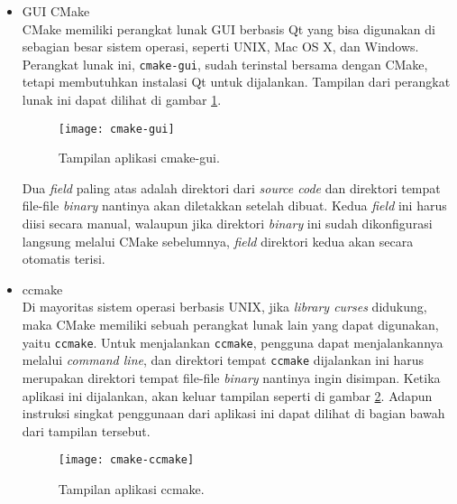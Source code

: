 \begin{enumerate}
	\begin{itemize}
		\item GUI CMake\\
		CMake memiliki perangkat lunak GUI berbasis Qt yang bisa digunakan di sebagian besar sistem operasi, seperti UNIX, Mac OS X, dan Windows. Perangkat lunak ini, \verb|cmake-gui|, sudah terinstal bersama dengan CMake, tetapi membutuhkan instalasi Qt untuk dijalankan. Tampilan dari perangkat lunak ini dapat dilihat di gambar \ref{fig:cmake-gui}.
		
		\begin{figure}[ht]
		    \centering
		    \texttt{[image: cmake-gui]}
		    \caption[Tampilan aplikasi cmake-gui]{Tampilan aplikasi cmake-gui.\protect\footnotemark}
		    \label{fig:cmake-gui}
		\end{figure}
		
		Dua \textit{field} paling atas adalah direktori dari \textit{source code} dan direktori tempat file-file \textit{binary} nantinya akan diletakkan setelah dibuat. Kedua \textit{field} ini harus diisi secara manual, walaupun jika direktori \textit{binary} ini sudah dikonfigurasi langsung melalui CMake sebelumnya, \textit{field} direktori kedua akan secara otomatis terisi.
		\newpage %
		\item ccmake\\
		Di mayoritas sistem operasi berbasis UNIX, jika \textit{library curses}	didukung, maka CMake memiliki sebuah perangkat lunak lain yang dapat digunakan, yaitu \verb|ccmake|. Untuk menjalankan \verb|ccmake|, pengguna dapat menjalankannya melalui \textit{command line}, dan direktori tempat \verb|ccmake| dijalankan ini harus merupakan direktori tempat file-file \textit{binary} nantinya ingin disimpan. Ketika aplikasi ini dijalankan, akan keluar tampilan seperti di gambar \ref{fig:cmake-ccmake}. Adapun instruksi singkat penggunaan dari aplikasi ini dapat dilihat di bagian bawah dari tampilan tersebut.
		
		\begin{figure}[ht]
		    \centering
		    \texttt{[image: cmake-ccmake]}
		    \caption[Tampilan aplikasi ccmake]{Tampilan aplikasi ccmake.\protect\footnotemark}
		    \label{fig:cmake-ccmake}
		\end{figure}
		

\end{itemize}
\end{enumerate}
